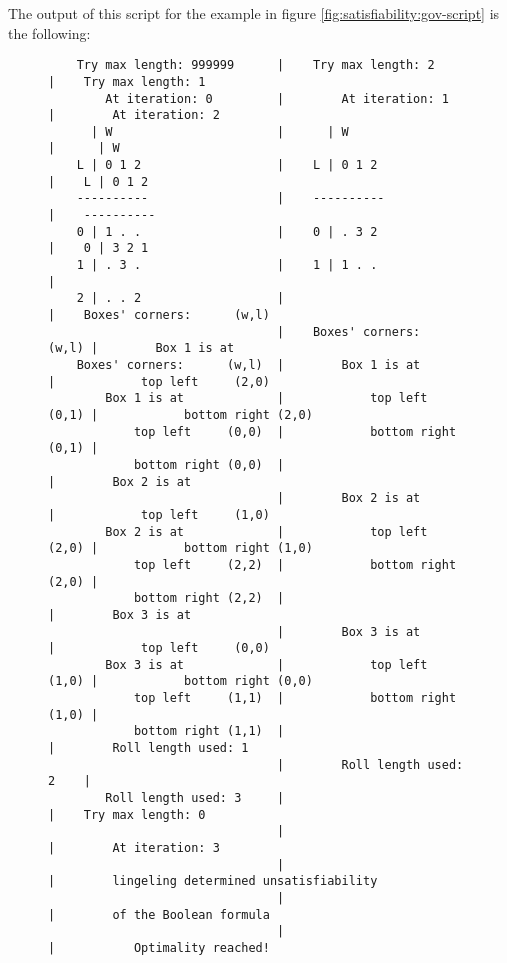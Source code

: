 The output of this script for the example in figure \ref{fig:satisfiability:gov-script}
is the following:
\begin{figure}[H]
\centering
{\scriptsize
\begin{BVerbatim}
    Try max length: 999999      |    Try max length: 2          |    Try max length: 1
        At iteration: 0         |        At iteration: 1        |        At iteration: 2
      | W                       |      | W                      |      | W
    L | 0 1 2                   |    L | 0 1 2                  |    L | 0 1 2 
    ----------                  |    ----------                 |    ----------
    0 | 1 . .                   |    0 | . 3 2                  |    0 | 3 2 1 
    1 | . 3 .                   |    1 | 1 . .                  |    
    2 | . . 2                   |                               |    Boxes' corners:      (w,l)
                                |    Boxes' corners:      (w,l) |        Box 1 is at 
    Boxes' corners:      (w,l)  |        Box 1 is at            |            top left     (2,0)
        Box 1 is at             |            top left     (0,1) |            bottom right (2,0)
            top left     (0,0)  |            bottom right (0,1) |    
            bottom right (0,0)  |                               |        Box 2 is at 
                                |        Box 2 is at            |            top left     (1,0)
        Box 2 is at             |            top left     (2,0) |            bottom right (1,0)
            top left     (2,2)  |            bottom right (2,0) |    
            bottom right (2,2)  |                               |        Box 3 is at 
                                |        Box 3 is at            |            top left     (0,0)
        Box 3 is at             |            top left     (1,0) |            bottom right (0,0)
            top left     (1,1)  |            bottom right (1,0) |    
            bottom right (1,1)  |                               |        Roll length used: 1
                                |        Roll length used: 2    |
        Roll length used: 3     |                               |    Try max length: 0
                                |                               |        At iteration: 3
                                |                               |        lingeling determined unsatisfiability
                                |                               |        of the Boolean formula
                                |                               |           Optimality reached!
\end{BVerbatim}
}
\label{fig:satisfiability:gov-script:result}
\end{figure}
